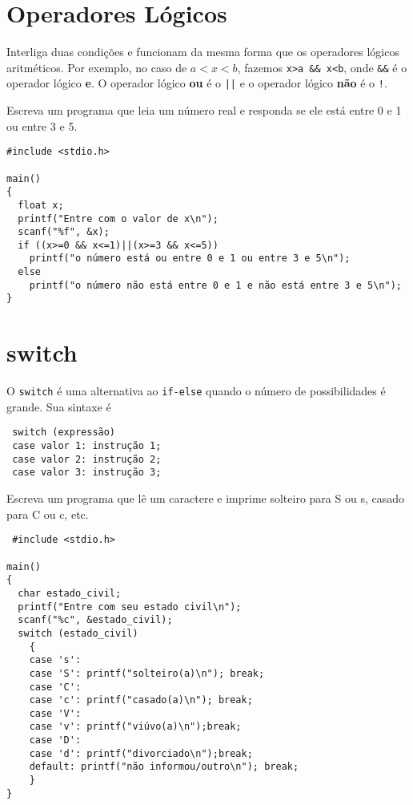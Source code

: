 \section{Operadores Lógicos}
Interliga duas condições e funcionam da mesma forma que os operadores lógicos aritméticos. Por exemplo, no caso de $a<x<b$, fazemos \verb|x>a && x<b|, onde \verb|&&| é o operador lógico {\bf e}. O operador lógico {\bf ou} é o \verb!||! e o operador lógico {\bf não} é o \verb|!|.
\begin{ex}\label{ex7} Escreva um programa que leia um número real e responda se ele está entre 0 e 1 ou entre 3 e 5.
\end{ex}
\begin{verbatim}
#include <stdio.h>

main()
{
  float x;
  printf("Entre com o valor de x\n");
  scanf("%f", &x);
  if ((x>=0 && x<=1)||(x>=3 && x<=5))
    printf("o número está ou entre 0 e 1 ou entre 3 e 5\n");
  else
    printf("o número não está entre 0 e 1 e não está entre 3 e 5\n");
}
\end{verbatim}

\section{switch}
O \verb|switch| é uma alternativa ao \verb|if-else| quando o número de possibilidades é grande. Sua sintaxe é 
\begin{verbatim}
 switch (expressão)
 case valor 1: instrução 1;
 case valor 2: instrução 2;
 case valor 3: instrução 3;
\end{verbatim}
\begin{ex}\label{ex8}Escreva um programa que lê um caractere e imprime solteiro para S ou s, casado para C ou c, etc.
\end{ex}
\begin{verbatim}
 #include <stdio.h>

main()
{
  char estado_civil;
  printf("Entre com seu estado civil\n");
  scanf("%c", &estado_civil);
  switch (estado_civil)
    {
    case 's':
    case 'S': printf("solteiro(a)\n"); break;
    case 'C': 
    case 'c': printf("casado(a)\n"); break;
    case 'V': 
    case 'v': printf("viúvo(a)\n");break;
    case 'D': 
    case 'd': printf("divorciado\n");break;
    default: printf("não informou/outro\n"); break;
    }
}
\end{verbatim}


